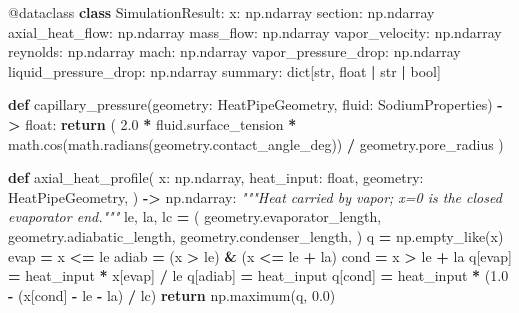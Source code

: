 \documentclass[
  12pt,a4paper,oneside]{report}
\newenvironment{Shaded}{\begin{snugshade}}{\end{snugshade}}
\newcommand{\AttributeTok}[1]{\textcolor[rgb]{0.77,0.63,0.00}{#1}}
\newcommand{\BuiltInTok}[1]{#1}
\newcommand{\CommentTok}[1]{\textcolor[rgb]{0.56,0.35,0.01}{\textit{#1}}}
\newcommand{\ControlFlowTok}[1]{\textcolor[rgb]{0.13,0.29,0.53}{\textbf{#1}}}
\newcommand{\FloatTok}[1]{\textcolor[rgb]{0.00,0.00,0.81}{#1}}
\newcommand{\KeywordTok}[1]{\textcolor[rgb]{0.13,0.29,0.53}{\textbf{#1}}}
\newcommand{\NormalTok}[1]{#1}
\newcommand{\OperatorTok}[1]{\textcolor[rgb]{0.81,0.36,0.00}{\textbf{#1}}}
\begin{document}
\begin{Shaded}
\begin{Highlighting}[]
\AttributeTok{@dataclass}
\KeywordTok{class}\NormalTok{ SimulationResult:}
\NormalTok{    x: np.ndarray}
\NormalTok{    section: np.ndarray}
\NormalTok{    axial\_heat\_flow: np.ndarray}
\NormalTok{    mass\_flow: np.ndarray}
\NormalTok{    vapor\_velocity: np.ndarray}
\NormalTok{    reynolds: np.ndarray}
\NormalTok{    mach: np.ndarray}
\NormalTok{    vapor\_pressure\_drop: np.ndarray}
\NormalTok{    liquid\_pressure\_drop: np.ndarray}
\NormalTok{    summary: }\BuiltInTok{dict}\NormalTok{[}\BuiltInTok{str}\NormalTok{, }\BuiltInTok{float} \OperatorTok{|} \BuiltInTok{str} \OperatorTok{|} \BuiltInTok{bool}\NormalTok{]}


\KeywordTok{def}\NormalTok{ capillary\_pressure(geometry: HeatPipeGeometry, fluid: SodiumProperties) }\OperatorTok{{-}\textgreater{}} \BuiltInTok{float}\NormalTok{:}
    \ControlFlowTok{return}\NormalTok{ (}
        \FloatTok{2.0} \OperatorTok{*}\NormalTok{ fluid.surface\_tension}
        \OperatorTok{*}\NormalTok{ math.cos(math.radians(geometry.contact\_angle\_deg))}
        \OperatorTok{/}\NormalTok{ geometry.pore\_radius}
\NormalTok{    )}


\KeywordTok{def}\NormalTok{ axial\_heat\_profile(}
\NormalTok{    x: np.ndarray, heat\_input: }\BuiltInTok{float}\NormalTok{, geometry: HeatPipeGeometry,}
\NormalTok{) }\OperatorTok{{-}\textgreater{}}\NormalTok{ np.ndarray:}
    \CommentTok{"""Heat carried by vapor; x=0 is the closed evaporator end."""}
\NormalTok{    le, la, lc }\OperatorTok{=}\NormalTok{ (}
\NormalTok{        geometry.evaporator\_length,}
\NormalTok{        geometry.adiabatic\_length,}
\NormalTok{        geometry.condenser\_length,}
\NormalTok{    )}
\NormalTok{    q }\OperatorTok{=}\NormalTok{ np.empty\_like(x)}
\NormalTok{    evap }\OperatorTok{=}\NormalTok{ x }\OperatorTok{\textless{}=}\NormalTok{ le}
\NormalTok{    adiab }\OperatorTok{=}\NormalTok{ (x }\OperatorTok{\textgreater{}}\NormalTok{ le) }\OperatorTok{\&}\NormalTok{ (x }\OperatorTok{\textless{}=}\NormalTok{ le }\OperatorTok{+}\NormalTok{ la)}
\NormalTok{    cond }\OperatorTok{=}\NormalTok{ x }\OperatorTok{\textgreater{}}\NormalTok{ le }\OperatorTok{+}\NormalTok{ la}
\NormalTok{    q[evap] }\OperatorTok{=}\NormalTok{ heat\_input }\OperatorTok{*}\NormalTok{ x[evap] }\OperatorTok{/}\NormalTok{ le}
\NormalTok{    q[adiab] }\OperatorTok{=}\NormalTok{ heat\_input}
\NormalTok{    q[cond] }\OperatorTok{=}\NormalTok{ heat\_input }\OperatorTok{*}\NormalTok{ (}\FloatTok{1.0} \OperatorTok{{-}}\NormalTok{ (x[cond] }\OperatorTok{{-}}\NormalTok{ le }\OperatorTok{{-}}\NormalTok{ la) }\OperatorTok{/}\NormalTok{ lc)}
    \ControlFlowTok{return}\NormalTok{ np.maximum(q, }\FloatTok{0.0}\NormalTok{)}



\end{Highlighting}
\end{Shaded}
\end{document}
